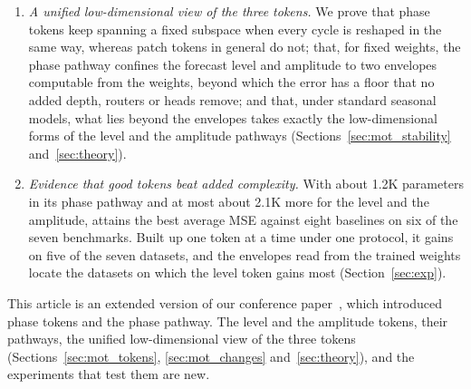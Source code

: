 {\begin{enumerate}[leftmargin=2em]
\item \emph{A unified low-dimensional view of the three tokens.} We prove that phase tokens keep spanning a fixed subspace when every cycle is reshaped in the same way, whereas patch tokens in general do not; that, for fixed weights, the phase pathway confines the forecast level and amplitude to two envelopes computable from the weights, beyond which the error has a floor that no added depth, routers or heads remove; and that, under standard seasonal models, what lies beyond the envelopes takes exactly the low-dimensional forms of the level and the amplitude pathways (Sections~\ref{sec:mot_stability} and~\ref{sec:theory}).

\item \emph{Evidence that good tokens beat added complexity.} With about 1.2K parameters in its phase pathway and at most about 2.1K more for the level and the amplitude, \sysplus attains the best average MSE against eight baselines on six of the seven benchmarks. Built up one token at a time under one protocol, it gains on five of the seven datasets, and the envelopes read from the trained weights locate the datasets on which the level token gains most (Section~\ref{sec:exp}).
\end{enumerate}

This article is an extended version of our conference paper~\citep{niu2026phaseformer}, which introduced phase tokens and the phase pathway. The level and the amplitude tokens, their pathways, the unified low-dimensional view of the three tokens (Sections~\ref{sec:mot_tokens}, \ref{sec:mot_changes} and~\ref{sec:theory}), and the experiments that test them are new.
}
